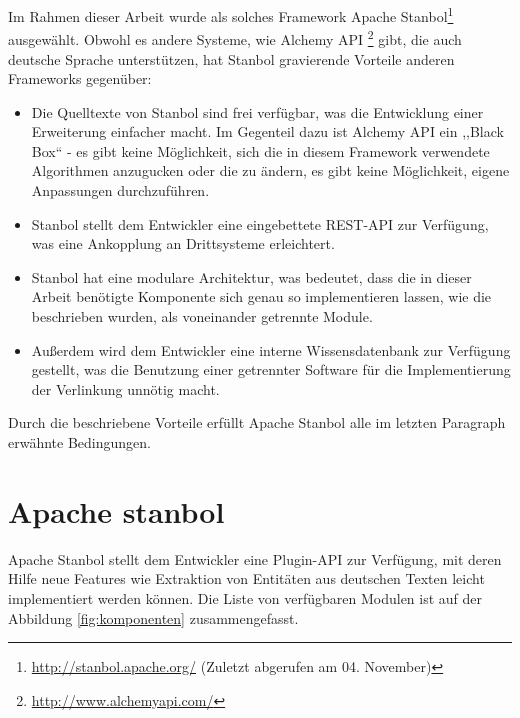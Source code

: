 Im Rahmen dieser Arbeit wurde als solches Framework Apache Stanbol\footnote{\url{http://stanbol.apache.org/} (Zuletzt abgerufen am 04. November)} ausgewählt. Obwohl es andere Systeme, wie Alchemy API \footnote{\url{http://www.alchemyapi.com/}} gibt, die auch deutsche Sprache unterstützen, hat Stanbol gravierende Vorteile anderen Frameworks gegenüber:
\begin{itemize}
\item Die Quelltexte von Stanbol sind frei verfügbar, was die Entwicklung einer Erweiterung einfacher macht. Im Gegenteil dazu ist Alchemy API ein ,,Black Box`` - es gibt keine Möglichkeit, sich die in diesem Framework verwendete Algorithmen anzugucken oder die zu ändern, es gibt keine Möglichkeit, eigene Anpassungen durchzuführen.
\item Stanbol stellt dem Entwickler eine eingebettete REST-API zur Verfügung, was eine Ankopplung an Drittsysteme erleichtert.
\item Stanbol hat eine modulare Architektur, was bedeutet, dass die in dieser Arbeit benötigte Komponente sich genau so implementieren lassen, wie die beschrieben wurden, als voneinander getrennte Module.
\item Außerdem wird dem Entwickler eine interne Wissensdatenbank zur Verfügung gestellt, was die Benutzung einer getrennter Software für die Implementierung der Verlinkung unnötig macht. 
\end{itemize}
Durch die beschriebene Vorteile erfüllt Apache Stanbol alle im letzten Paragraph erwähnte Bedingungen.

\section{Apache stanbol}
Apache Stanbol stellt dem Entwickler eine Plugin-API zur Verfügung, mit deren Hilfe neue Features wie Extraktion von Entitäten aus deutschen Texten leicht implementiert werden können. Die Liste von verfügbaren Modulen ist auf der Abbildung \ref{fig:komponenten} zusammengefasst.

